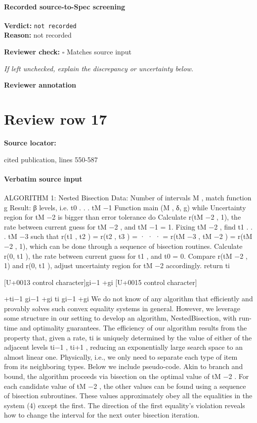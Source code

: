 \documentclass[10pt]{article}
\newcommand{\reviewerbox}{%
  \par\noindent\fbox{\parbox{0.96\linewidth}{\rule{0pt}{0.38in}}}\par
}
\newcommand{\reviewmatch}[1]{%
  \par\noindent\textbf{Reviewer check:} $\square$\; #1\par
  \noindent\emph{If left unchecked, explain the discrepancy or uncertainty below.}\par
}
\begin{document}
\paragraph{Recorded source-to-Spec screening}
\textbf{Verdict:} \texttt{not recorded}
\\
\textbf{Reason:} not recorded
\reviewmatch{Matches source input}
\noindent\textbf{Reviewer annotation}\par
\reviewerbox
\clearpage
\hypertarget{source-claim-71d943c2f56bac62}{}
\section*{Review row 17}
\textbf{Source locator:} {\footnotesize\raggedright cited publication, lines 550-\allowbreak{}587\par}
\paragraph{Verbatim source input}
\begin{ReviewVerbatim}
ALGORITHM 1: Nested Bisection
Data: Number of intervals M , match function g
Result: β levels, i.e. {t0 . . . tM −1 }
Function main (M , δ, g)
while Uncertainty region for tM −2 is bigger
than error tolerance do
Calculate r(tM −2 , 1), the rate between
current guess for tM −2 , and tM −1 = 1.
Fixing tM −2 , find t1 . . . tM −3 such that
r(t1 , t2 ) = r(t2 , t3 ) = · · · =
r(tM −3 , tM −2 ) = r(tM −2 , 1), which can be
done through a sequence of bisection
routines.
Calculate r(0, t1 ), the rate between current
guess for t1 , and t0 = 0.
Compare r(tM −2 , 1) and r(0, t1 ), adjust
uncertainty region for tM −2 accordingly.
return {ti }

[U+0013 control character]gi−1 +gi [U+0015 control character]

+ti−1 gi−1 +gi ti gi−1 +gi
We do not know of any algorithm that efficiently
and provably solves such convex equality systems
in general. However, we leverage some structure in
our setting to develop an algorithm, NestedBisection, with run-time and optimality guarantees. The
efficiency of our algorithm results from the property
that, given a rate, ti is uniquely determined by the
value of either of the adjacent levels ti−1 , ti+1 , reducing an exponentially large search space to an almost
linear one. Physically, i.e., we only need to separate
each type of item from its neighboring types.
Below we include pseudo-code. Akin to branch and
bound, the algorithm proceeds via bisection on the
optimal value of tM −2 . For each candidate value
of tM −2 , the other values can be found using a sequence of bisection subroutines. These values approximately obey all the equalities in the system (4)
except the first. The direction of the first equality’s
violation reveals how to change the interval for the
next outer bisection iteration.
\end{ReviewVerbatim}
\end{document}
